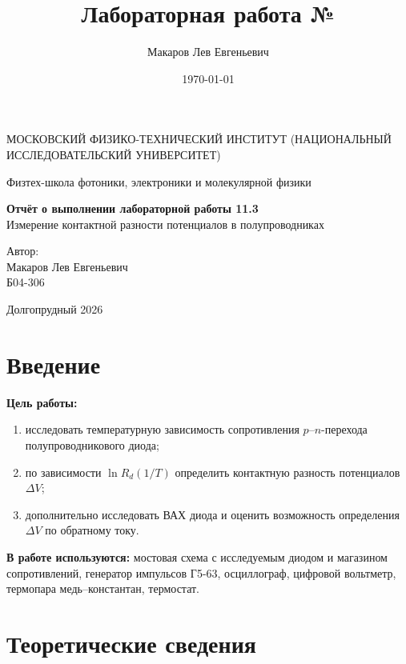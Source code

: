 \documentclass[a4paper,12pt]{article}
\author{Макаров Лев Евгеньевич}
\title{Лабораторная работа №\labnumber\\\labname}
\date{\today}
\newcommand\labname{Измерение контактной разности потенциалов в полупроводниках}
\newcommand\labnumber{11.3}
\begin{document}
\begin{titlepage}
    \begin{center}
        {\large МОСКОВСКИЙ ФИЗИКО-ТЕХНИЧЕСКИЙ ИНСТИТУТ (НАЦИОНАЛЬНЫЙ ИССЛЕДОВАТЕЛЬСКИЙ УНИВЕРСИТЕТ)}
    \end{center}
    \begin{center}
        {\large Физтех-школа фотоники, электроники и молекулярной физики}
    \end{center}

    \vspace{4.5cm}
    {\huge
        \begin{center}
            {\bf Отчёт о выполнении лабораторной работы \labnumber}\\
            \labname
        \end{center}
    }
    \vspace{2cm}
    \begin{flushright}
        {\LARGE Автор:\\ Макаров Лев Евгеньевич\\
        \vspace{0.2cm}
        Б04-306}
    \end{flushright}
    \vspace{8cm}
    \begin{center}
        Долгопрудный 2026
    \end{center}
\end{titlepage}

\section{Введение}

\textbf{Цель работы:}
\begin{enumerate}
    \item исследовать температурную зависимость сопротивления $p$--$n$-перехода полупроводникового диода;
    \item по зависимости $\ln R_d(1/T)$ определить контактную разность потенциалов $\Delta V$;
    \item дополнительно исследовать ВАХ диода и оценить возможность определения $\Delta V$ по обратному току.
\end{enumerate}

\textbf{В работе используются:} мостовая схема с исследуемым диодом и магазином сопротивлений, генератор импульсов Г5-63, осциллограф, цифровой вольтметр, термопара медь--константан, термостат.

\section{Теоретические сведения}
\end{document}
